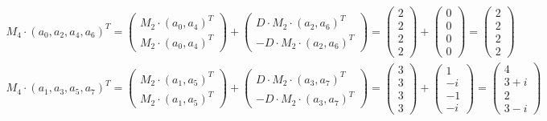 \documentclass[a4paper,12pt]{article}
\begin{document}
\begin{solution}
	\begin{gather*}
	M_4 \cdot (a_0,a_2,a_4,a_6)^T =  \left(
	\begin{array}{c}
	M_2 \cdot (a_0,a_4)^T \\
	M_2 \cdot (a_0,a_4)^T
	\end{array}
	\right) + \left(
	\begin{array}{c}
	D \cdot M_2 \cdot (a_2,a_6)^T \\
	-D \cdot M_2 \cdot (a_2,a_6)^T
	\end{array}
	\right) = \left(
	\begin{array}{c}
	2 \\
	2 \\
	2 \\
	2
	\end{array}
	\right) + \left(
	\begin{array}{c}
	0 \\
	0 \\
	0 \\
	0
	\end{array}
	\right) = \left(
	\begin{array}{c}
	2 \\
	2 \\
	2 \\
	2
	\end{array}
	\right)\\
	M_4 \cdot (a_1,a_3,a_5,a_7)^T =  \left(
	\begin{array}{c}
	M_2 \cdot (a_1,a_5)^T \\
	M_2 \cdot (a_1,a_5)^T
	\end{array}
	\right) + \left(
	\begin{array}{c}
	D \cdot M_2 \cdot (a_3,a_7)^T \\
	-D \cdot M_2 \cdot (a_3,a_7)^T
	\end{array}
	\right) = \left(
	\begin{array}{c}
	3 \\
	3 \\
	3 \\
	3
	\end{array}
	\right) + \left(
	\begin{array}{c}
	1 \\
	-i \\
	-1 \\
	-i
	\end{array}
	\right) = \left(
	\begin{array}{c}
	4 \\
	3+i \\
	2 \\
	3-i
	\end{array}
	\right)\\
	\end{gather*}
	

\end{solution}
\end{document}
